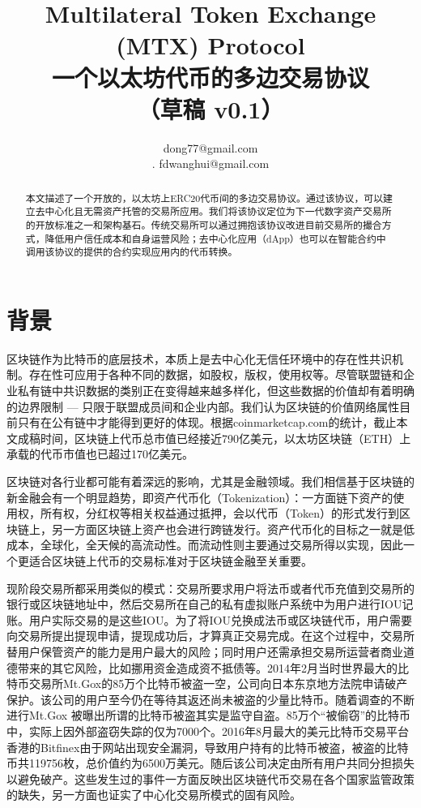 \documentclass[UTF8,nofonts]{ctexart}
\title{Multilateral Token Exchange (MTX) Protocol\\一个以太坊代币的多边交易协议\\（草稿 v0.1）}
\author{
    dong77@gmail.com\\.
    fdwanghui@gmail.com    %
}
\begin{document}
\maketitle

\begin{abstract}
本文描述了一个开放的，以太坊上ERC20代币间的多边交易协议。通过该协议，可以建立去中心化且无需资产托管的交易所应用。我们将该协议定位为下一代数字资产交易所的开放标准之一和架构基石。传统交易所可以通过拥抱该协议改进目前交易所的撮合方式，降低用户信任成本和自身运营风险；去中心化应用（dApp）也可以在智能合约中调用该协议的提供的合约实现应用内的代币转换。

\end{abstract}

\newpage

\tableofcontents
\newpage

\section{背景\label{sec:background}}

区块链作为比特币的底层技术，本质上是去中心化无信任环境中的存在性共识机制。存在性可应用于各种不同的数据，如股权，版权，使用权等。尽管联盟链和企业私有链中共识数据的类别正在变得越来越多样化，但这些数据的价值却有着明确的边界限制 --- 只限于联盟成员间和企业内部。我们认为区块链的价值网络属性目前只有在公有链中才能得到更好的体现。根据coinmarketcap.com的统计，截止本文成稿时间，区块链上代币总市值已经接近790亿美元，以太坊区块链（ETH）上承载的代币市值也已超过170亿美元。

区块链对各行业都可能有着深远的影响，尤其是金融领域。我们相信基于区块链的新金融会有一个明显趋势，即资产代币化（Tokenization）：一方面链下资产的使用权，所有权，分红权等相关权益通过抵押，会以代币（Token）的形式发行到区块链上，另一方面区块链上资产也会进行跨链发行。资产代币化的目标之一就是低成本，全球化，全天候的高流动性。而流动性则主要通过交易所得以实现，因此一个更适合区块链上代币的交易标准对于区块链金融至关重要。

现阶段交易所都采用类似的模式：交易所要求用户将法币或者代币充值到交易所的银行或区块链地址中，然后交易所在自己的私有虚拟账户系统中为用户进行IOU记账。用户实际交易的是这些IOU。为了将IOU兑换成法币或区块链代币，用户需要向交易所提出提现申请，提现成功后，才算真正交易完成。在这个过程中，交易所替用户保管资产的能力是用户最大的风险；同时用户还需承担交易所运营者商业道德带来的其它风险，比如挪用资金造成资不抵债等。2014年2月当时世界最大的比特币交易所Mt.Gox的85万个比特币被盗一空，公司向日本东京地方法院申请破产保护。该公司的用户至今仍在等待其返还尚未被盗的少量比特币。随着调查的不断进行Mt.Gox 被曝出所谓的比特币被盗其实是监守自盗。85万个“被偷窃”的比特币中，实际上因外部盗窃失踪的仅为7000个。2016年8月最大的美元比特币交易平台香港的Bitfinex由于网站出现安全漏洞，导致用户持有的比特币被盗，被盗的比特币共119756枚，总价值约为6500万美元。随后该公司决定由所有用户共同分担损失以避免破产。这些发生过的事件一方面反映出区块链代币交易在各个国家监管政策的缺失，另一方面也证实了中心化交易所模式的固有风险。
\end{document}
